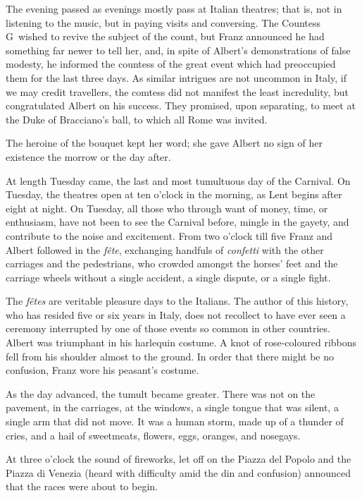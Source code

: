  The evening passed as evenings mostly pass at Italian theatres; that is, not in listening to the music, but in paying visits and conversing. The Countess G\doubleemdash~wished to revive the subject of the count, but Franz announced he had something far newer to tell her, and, in spite of Albert's demonstrations of false modesty, he informed the countess of the great event which had preoccupied them for the last three days. As similar intrigues are not uncommon in Italy, if we may credit travellers, the comtess did not manifest the least incredulity, but congratulated Albert on his success. They promised, upon separating, to meet at the Duke of Bracciano's ball, to which all Rome was invited. 

 The heroine of the bouquet kept her word; she gave Albert no sign of her existence the morrow or the day after. 

 At length Tuesday came, the last and most tumultuous day of the Carnival. On Tuesday, the theatres open at ten o'clock in the morning, as Lent begins after eight at night. On Tuesday, all those who through want of money, time, or enthusiasm, have not been to see the Carnival before, mingle in the gayety, and contribute to the noise and excitement. From two o'clock till five Franz and Albert followed in the \textit{fête}, exchanging handfuls of \textit{confetti} with the other carriages and the pedestrians, who crowded amongst the horses' feet and the carriage wheels without a single accident, a single dispute, or a single fight. 

 The \textit{fêtes} are veritable pleasure days to the Italians. The author of this history, who has resided five or six years in Italy, does not recollect to have ever seen a ceremony interrupted by one of those events so common in other countries. Albert was triumphant in his harlequin costume. A knot of rose-coloured ribbons fell from his shoulder almost to the ground. In order that there might be no confusion, Franz wore his peasant's costume. 

 As the day advanced, the tumult became greater. There was not on the pavement, in the carriages, at the windows, a single tongue that was silent, a single arm that did not move. It was a human storm, made up of a thunder of cries, and a hail of sweetmeats, flowers, eggs, oranges, and nosegays. 

 At three o'clock the sound of fireworks, let off on the Piazza del Popolo and the Piazza di Venezia (heard with difficulty amid the din and confusion) announced that the races were about to begin. 

